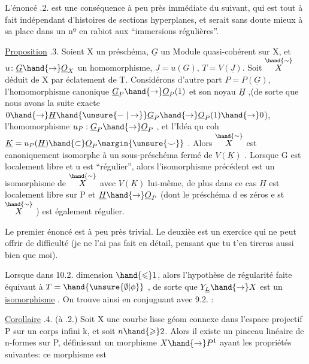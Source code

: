 
L'énoncé .2. est une conséquence à peu près immédiate du suivant,
\margin{|}qui est tout à fait indépendant d'histoires de sections hyperplanes, et
serait sans doute mieux à sa place dans  un nº en rabiot aux
``immersions régulières''.

\margin{|}\margin{\unsure{$\backslash\,/$}}\uline{Proposition} .3. Soient X un préschéma,  $\underline{G}$ un Module quasi-cohérent
sur X, et $u\colon \underline{G}\hand{\to}\underline{O}_X$ un homomorphisme, $\underline{J} = u(G)$, $T=V(\underline{J})$. Soit
$\overset{\hand{\sim}}{X}$ déduit de X par éclatement de T. Considérons d'autre part
$P = P(\underline{G})$, l'homomorphisme canonique $\underline{G}_P\hand{\to}\underline{O}_P(1)$ et son noyau
$\underline{H}$ ,(de sorte que nous avons la suite exacte $0\hand{\to}\underline{H}\hand{\unsure{\relbar|\to}}\underline{G}_P\hand{\to}\underline{O}_P(1)\hand{\to}0$),
l'homomorphisme $u_P : \underline{G}_P \hand{\to} \underline{O}_P$ , et l'Idéa qu coh $\underline{K} = u_P(\underline{H})\hand{\subset}\underline{O}_P\margin{\unsure{\smile}}$ .
Alors $\overset{\hand{\sim}}{X}$ est canoniquement isomorphe à un sous-préschéma fermé de
$V(\underline{K})$ . Lorsque G est localement libre et u est ``régulier'', alors
l'isomorphisme précédent est un isomorphisme de $\overset{\hand{\sim}}{X}$ avec $V(\underline{K})$ lui-même,
de plus dans ce cas $\underline{H}$ est localement libre sur P et  $\underline{H}\hand{\to}\underline{O}_P$
(dont le préschéma d es zéros e st $\overset{\hand{\sim}}{X}$ ) est également régulier.

Le premier énoncé est à peu près trivial. Le deuxièe est un
exercice qui ne peut offrir de difficulté (je ne l'ai pas fait en
détail, pensant que tu t'en tireras aussi bien que moi).

Lorsque dans 10.2.   dimension $\hand{\leqslant}1$,
alors l'hypothèse de régularité faite équivaut à $T = \hand{\unsure{\emptyset|\phi}}$ , de sorte
que $Y_{\underline{L}}\hand{\to} X$ est un \uline{isomorphisme} . On trouve ainsi\hand{;} en conjuguant
avec 9.2. :

\uline{Corollaire} .4. (à .2.) Soit X une courbe lisse géom connexe dans
 l'espace projectif P sur un corps infini k, et soit $n\hand{\geqslant}2$.
Alors il existe un pinceau linéaire de n-formes sur P, définissant un
morphisme $X\hand{\to}P^1$ ayant les propriétés suivantes: ce morphisme est


